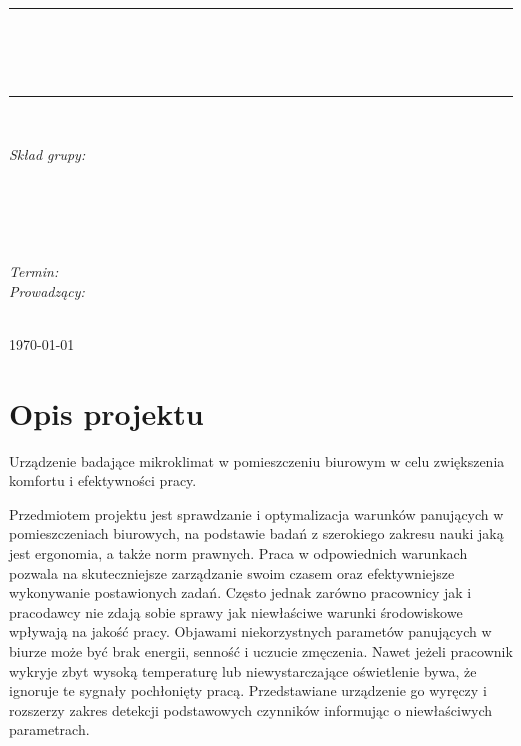 \documentclass[10pt, a4paper]{article}
\begin{document}
\def\tablename{Tabela}	%

\begin{titlepage}
	\begin{center}
		\textsc{\LARGE \formakursu}\\[1cm]		
		\textsc{\Large \kurs}\\[0.5cm]		
		\rule{\textwidth}{0.08cm}\\[0.4cm]
		{\huge \bfseries \doctype}\\[1cm]
		{\huge \bfseries \projectname}\\[0.5cm]
		\rule{\textwidth}{0.08cm}\\[1cm]
		
		\begin{flushright} \large
		\emph{Skład grupy:}\\
		\osobaA\\
		\osobaB\\
		\osobaC\\
		\osobaD\\
		\osobaE\\[0.4cm]
		
		\emph{Termin: }\termin\\[0.4cm]

		\emph{Prowadzący:} \\
		\prowadzacy \\
		
		\end{flushright}
		
		\vfill
		
		{\large \today}
	\end{center}	
\end{titlepage}

\newpage
\tableofcontents
\newpage

\section{Opis projektu}
\label{sec:OpisProjektu}

Urządzenie badające mikroklimat w pomieszczeniu biurowym w celu zwiększenia komfortu i efektywności pracy.

Przedmiotem projektu jest sprawdzanie i optymalizacja warunków panujących w pomieszczeniach biurowych, na podstawie badań z szerokiego zakresu nauki jaką jest ergonomia, a także norm prawnych. 
Praca w odpowiednich warunkach pozwala na skuteczniejsze zarządzanie swoim czasem oraz efektywniejsze
wykonywanie postawionych zadań. Często jednak zarówno pracownicy jak i pracodawcy nie zdają sobie sprawy jak niewłaściwe warunki środowiskowe wpływają na jakość pracy. Objawami niekorzystnych parametów panujących w biurze może być brak energii, senność i uczucie zmęczenia. Nawet jeżeli pracownik wykryje zbyt wysoką temperaturę lub niewystarczające oświetlenie bywa, że ignoruje te sygnały pochłonięty pracą. Przedstawiane urządzenie go wyręczy i rozszerzy zakres detekcji podstawowych czynników informując o niewłaściwych parametrach.
\end{document}
